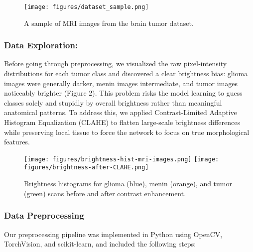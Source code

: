 \documentclass[twocolumn,superscriptaddress,aps]{revtex4-1}
\begin{document}
\begin{figure}[htbp]
    \centering
    \texttt{[image: figures/dataset\_sample.png]}
    \caption{A sample of MRI images from the brain tumor dataset.}
    \label{Figure 1: dataset}
\end{figure}

\subsubsection{Data Exploration:}
Before going through preprocessing, we visualized the raw pixel‑intensity distributions for each tumor class and discovered a clear brightness bias: glioma images were generally darker, menin images intermediate, and tumor images noticeably brighter (Figure 2). This problem risks the model learning to guess classes solely and stupidly by overall brightness rather than meaningful anatomical patterns. To address this, we applied Contrast‑Limited Adaptive Histogram Equalization (CLAHE) to flatten large‑scale brightness differences while preserving local tissue to force the network to focus on true morphological features.

\begin{figure}[htbp]
    \centering
    \texttt{[image: figures/brightness-hist-mri-images.png]}
    \texttt{[image: figures/brightness-after-CLAHE.png]}
    \caption{Brightness histograms for glioma (blue), menin (orange), and tumor (green) scans before and after contrast enhancement.}
    \label{Figure 2: brightness bias}
\end{figure}


\subsubsection{Data Preprocessing}
Our preprocessing pipeline was implemented in Python using OpenCV, TorchVision, and scikit-learn, and included the following steps:
\end{document}
